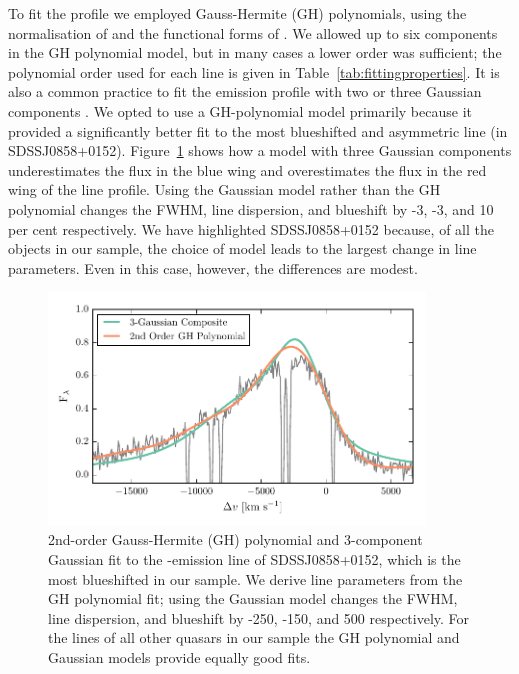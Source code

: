 To fit the  profile we employed Gauss-Hermite (GH) polynomials, using the normalisation of \citet{marel93} and the functional forms of \citet{cappellari02}.
We allowed up to six components in the GH polynomial model, but in many cases a lower order was sufficient; the polynomial order used for each line is given in Table~\ref{tab:fittingproperties}.
It is also a common practice to fit the  emission profile with two or three Gaussian components \citep[e.g.][]{shen11}. 
We opted to use a GH-polynomial model primarily because it provided a significantly better fit to the most blueshifted and asymmetric  line (in SDSSJ0858+0152).  
Figure~\ref{fig:fitting_comparison} shows how a model with three Gaussian components underestimates the flux in the blue wing and overestimates the flux in the red wing of the line profile. 
Using the Gaussian model rather than the GH polynomial changes the FWHM, line dispersion, and blueshift by -3, -3, and 10\,per cent respectively.
We have highlighted SDSSJ0858+0152 because, of all the objects in our sample, the choice of model leads to the largest change in  line parameters.
Even in this case, however, the differences are modest. 

\begin{figure}
    \includegraphics[width=10cm]{figures/chapter02/fitting_comparison.pdf} 
    \caption{2nd-order Gauss-Hermite (GH) polynomial and 3-component Gaussian fit to the -emission line of SDSSJ0858+0152, which is the most blueshifted in our sample. We derive line parameters from the GH polynomial fit; using the Gaussian model changes the FWHM, line dispersion, and blueshift by -250, -150, and 500 \kms respectively. For the  lines of all other quasars in our sample the GH polynomial and Gaussian models provide equally good fits.} 
    \label{fig:fitting_comparison}
\end{figure}

